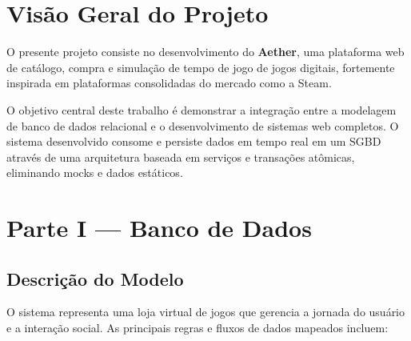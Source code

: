 \documentclass[12pt,a4paper]{article}
\begin{document}
\newpage
\tableofcontents
\newpage

\section{Visão Geral do Projeto}
O presente projeto consiste no desenvolvimento do \textbf{Aether}, uma plataforma web de catálogo, compra e simulação de tempo de jogo de jogos digitais, fortemente inspirada em plataformas consolidadas do mercado como a Steam. 

O objetivo central deste trabalho é demonstrar a integração entre a modelagem de banco de dados relacional e o desenvolvimento de sistemas web completos. O sistema desenvolvido consome e persiste dados em tempo real em um SGBD através de uma arquitetura baseada em serviços e transações atômicas, eliminando mocks e dados estáticos.

\section{Parte I — Banco de Dados}

\subsection{Descrição do Modelo}
O sistema representa uma loja virtual de jogos que gerencia a jornada do usuário e a interação social. As principais regras e fluxos de dados mapeados incluem:
\end{document}

